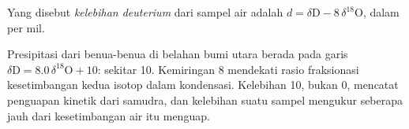 \begin{definition}\label{def:b3:stable-isotopes:d-excess}
Yang disebut \emph{kelebihan deuterium} dari sampel air adalah $d =
\delta\mathrm D - 8\,\delta^{18}\mathrm O$, dalam per mil.
\end{definition}

Presipitasi dari benua-benua di belahan bumi utara berada pada garis
$\delta\mathrm D = 8.0\,\delta^{18}\mathrm O + 10$:  sekitar
\qty{10}{\permil}. Kemiringan 8 mendekati rasio fraksionasi kesetimbangan
kedua isotop dalam kondensasi. Kelebihan 10, bukan 0,
mencatat penguapan kinetik dari samudra, dan kelebihan suatu sampel
mengukur seberapa jauh dari kesetimbangan air itu menguap.

